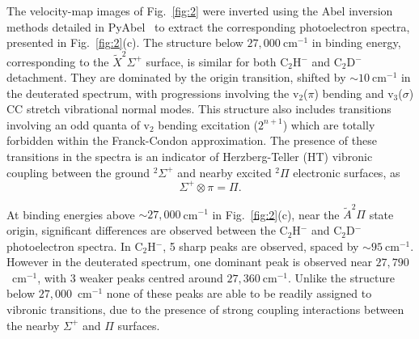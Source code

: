 \documentclass[aip,graphicx]{revtex4-1}
\begin{document}
The velocity-map images of Fig.~\ref{fig:2} were inverted using the Abel inversion methods detailed in PyAbel~\cite{hic19} to extract the corresponding photoelectron spectra, presented in Fig.~\ref{fig:2}(c). The structure below $27,000~$cm$^{-1}$ in binding energy, corresponding to the $\tilde{X} ^2\Sigma^+$ surface, is similar for both C$_2$H$^-$ and C$_2$D$^-$ detachment. They are dominated by the origin transition, shifted by $\sim10~$cm$^{-1}$ in the deuterated spectrum, with progressions involving the v$_2$($\pi$) bending and v$_3$($\sigma$) CC stretch vibrational normal modes. This structure also includes transitions involving an odd quanta of v$_2$ bending excitation ($2^{n+1}$) which are totally forbidden within the Franck-Condon approximation. The presence of these transitions in the spectra is an indicator of Herzberg-Teller (HT) vibronic coupling between the ground $^2\Sigma^+$ and nearby excited $^2\Pi$ electronic surfaces, as
\begin{equation}
\Sigma^+ \otimes \pi = \Pi. 
\label{eq:9}
\end{equation}

At binding energies above $\sim27,000~$cm$^{-1}$ in Fig.~\ref{fig:2}(c), near the $\tilde{A}^2\Pi$ state origin, significant differences are observed between the C$_2$H$^-$ and C$_2$D$^-$ photoelectron spectra. In C$_2$H$^-$, 5 sharp peaks are observed, spaced by $\sim95~$cm$^{-1}$. However in the deuterated spectrum, one dominant peak is observed near $27,790$~cm$^{-1}$, with 3 weaker peaks centred around $27,360~$cm$^{-1}$. Unlike the structure below $27,000$~cm$^{-1}$ none of these peaks are able to be readily assigned to vibronic transitions, due to the presence of strong coupling interactions between the nearby $\Sigma^+$ and $\Pi$ surfaces.

\end{document}
